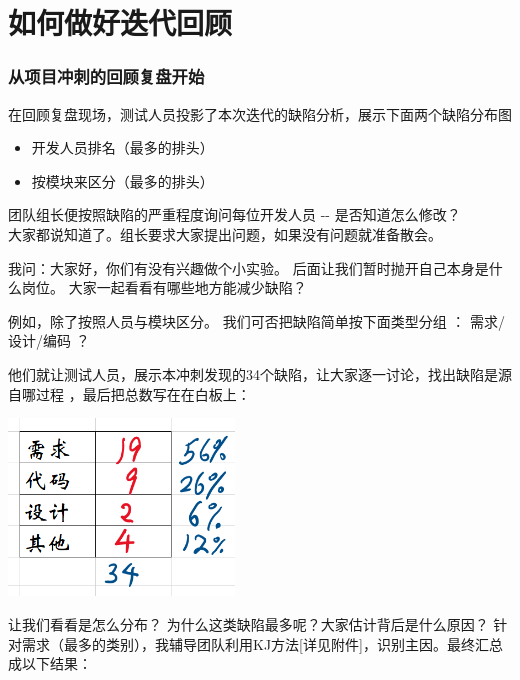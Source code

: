 \chapter{如何做好迭代回顾} %


\hypertarget{ux4eceux9879ux76eeux51b2ux523aux7684ux56deux987eux590dux76d8ux5f00ux59cb}{%
\subsection{从项目冲刺的回顾复盘开始}\label{ux4eceux9879ux76eeux51b2ux523aux7684ux56deux987eux590dux76d8ux5f00ux59cb}}

在回顾复盘现场，测试人员投影了本次迭代的缺陷分析，展示下面两个缺陷分布图
\begin{itemize}
\tightlist
\item
  开发人员排名（最多的排头）
\item
  按模块来区分（最多的排头）
\end{itemize}

团队组长便按照缺陷的严重程度询问每位开发人员 -\/- 是否知道怎么修改？\\
大家都说知道了。组长要求大家提出问题，如果没有问题就准备散会。

我问：大家好，你们有没有兴趣做个小实验。
后面让我们暂时抛开自己本身是什么岗位。
大家一起看看有哪些地方能减少缺陷？

例如，除了按照人员与模块区分。 我们可否把缺陷简单按下面类型分组 ：
需求/设计/编码 ？

他们就让测试人员，展示本冲刺发现的34个缺陷，让大家逐一讨论，找出缺陷是源自哪过程
，最后把总数写在在白板上：


\includegraphics[width=6cm]{DefectsBySourceScreenshot_2021-09-20_155232.png}

让我们看看是怎么分布？ 为什么这类缺陷最多呢？大家估计背后是什么原因？
针对需求（最多的类别），我辅导团队利用KJ方法{[}详见附件{]}，识别主因。最终汇总成以下结果：\\

